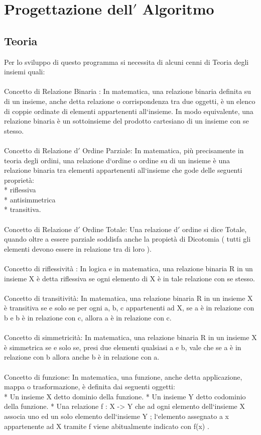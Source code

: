 \documentclass[11pt, a4paper, titlepage, block]{article}
\begin{document}
	\newpage                        
	\section{Progettazione dell$'$ Algoritmo}
	\subsection{Teoria}
	Per lo sviluppo di questo programma si necessita di alcuni cenni di Teoria degli insiemi quali:\\
	\\
	Concetto di Relazione Binaria : In matematica, una relazione binaria definita su di un insieme, anche detta relazione o corrispondenza tra due oggetti, \`e un elenco di coppie ordinate di elementi appartenenti all`insieme. In modo equivalente, una relazione binaria \`e un sottoinsieme del prodotto cartesiano di un insieme con se stesso.\\
	\\
	Concetto di Relazione d$'$ Ordine Parziale: In matematica, più precisamente in teoria degli ordini, una relazione d`ordine o ordine su di un insieme \`e una relazione binaria tra elementi appartenenti all`insieme che gode delle seguenti propriet\`a:\\
	* riflessiva\\
	* antisimmetrica\\
	* transitiva.\\
	\\
	Concetto di Relazione d$'$ Ordine Totale: Una relazione d$'$ ordine si dice Totale, quando oltre a essere parziale soddisfa anche la propiet\`a di Dicotomia ( tutti gli elementi devono essere in relazione tra di loro ).\\
	\\
	Concetto di riflessivit\`a : In logica e in matematica, una relazione binaria R in un insieme X \`e detta riflessiva se ogni elemento di X \`e in tale relazione con se stesso.        \\
	\\
	Concetto di transitivit\`a: In matematica, una relazione binaria R in un insieme X \`e transitiva se e solo se per ogni a, b, c appartenenti ad X, se a \`e in relazione con b e b \`e in relazione con c, allora a \`e in relazione con c. \\
	\\
	Concetto di simmetricit\`a: In matematica, una relazione binaria R in un insieme X \`e simmetrica se e solo se, presi due elementi qualsiasi a e b, vale che se a \`e in relazione con b allora anche b \`e in relazione con a.\\
	\\
	Concetto di funzione: In matematica, una funzione, anche detta applicazione, mappa o trasformazione, \`e definita dai seguenti oggetti:\\
	* Un insieme  X  detto dominio della funzione.
	* Un insieme  Y  detto codominio della funzione.
	* Una relazione  f : X -> Y  che ad ogni elemento dell`insieme  X  associa uno ed un solo elemento dell`insieme  Y ; l`elemento assegnato a  x appartenente ad X  tramite  f  viene abitualmente indicato con  f(x) .\\
	\newpage
	
\end{document}
